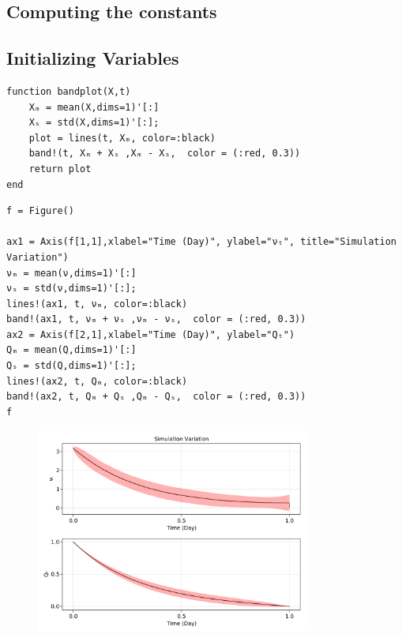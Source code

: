 \subsection{Computing the constants}

\subsection{Initializing Variables}

\begin{lstlisting}[language=JuliaLocal, style=julia]
function bandplot(X,t)
    Xₘ = mean(X,dims=1)'[:]
    Xₛ = std(X,dims=1)'[:];
    plot = lines(t, Xₘ, color=:black)
    band!(t, Xₘ + Xₛ ,Xₘ - Xₛ,  color = (:red, 0.3))
    return plot
end
\end{lstlisting}

\begin{lstlisting}[language=JuliaLocal, style=julia]
f = Figure()

ax1 = Axis(f[1,1],xlabel="Time (Day)", ylabel="νₜ", title="Simulation Variation")
νₘ = mean(ν,dims=1)'[:]
νₛ = std(ν,dims=1)'[:];
lines!(ax1, t, νₘ, color=:black)
band!(ax1, t, νₘ + νₛ ,νₘ - νₛ,  color = (:red, 0.3))
ax2 = Axis(f[2,1],xlabel="Time (Day)", ylabel="Qₜ")
Qₘ = mean(Q,dims=1)'[:]
Qₛ = std(Q,dims=1)'[:];
lines!(ax2, t, Qₘ, color=:black)
band!(ax2, t, Qₘ + Qₛ ,Qₘ - Qₛ,  color = (:red, 0.3))
f
\end{lstlisting}

\begin{figure}[H]
	\centering
	\includegraphics[width=0.8\textwidth]{./figures/Trabalho1_figure1.pdf}
	\label{fig:Trabalho1_figure1}

\end{figure}

